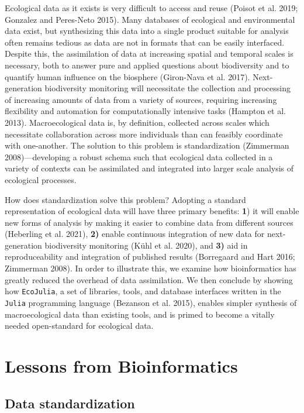 \documentclass[10pt,oneside]{article}
\begin{document}
Ecological data as it exists is very difficult to access and reuse
(Poisot et al. 2019; Gonzalez and Peres-Neto 2015). Many databases of
ecological and environmental data exist, but synthesizing this data into
a single product suitable for analysis often remains tedious as data are
not in formats that can be easily interfaced. Despite this, the
assimilation of data at increasing spatial and temporal scales is
necessary, both to answer pure and applied questions about biodiversity
and to quantify human influence on the biosphere (Giron-Nava et al.
2017). Next-generation biodiversity monitoring will necessitate the
collection and processing of increasing amounts of data from a variety
of sources, requiring increasing flexibility and automation for
computationally intensive tasks (Hampton et al. 2013). Macroecological
data is, by definition, collected across scales which necessitate
collaboration across more individuals than can feasibly coordinate with
one-another. The solution to this problem is standardization (Zimmerman
2008)---developing a robust schema such that ecological data collected
in a variety of contexts can be assimilated and integrated into larger
scale analysis of ecological processes.

How does standardization solve this problem? Adopting a standard
representation of ecological data will have three primary benefits:
\textbf{1}) it will enable new forms of analysis by making it easier to
combine data from different sources (Heberling et al. 2021), \textbf{2)}
enable continuous integration of new data for next-generation
biodiversity monitoring (Kühl et al. 2020), and \textbf{3)} aid in
reproduceability and integration of published results (Borregaard and
Hart 2016; Zimmerman 2008). In order to illustrate this, we examine how
bioinformatics has greatly reduced the overhead of data assimilation. We
then conclude by showing how \texttt{EcoJulia}, a set of libraries,
tools, and database interfaces written in the \texttt{Julia} programming
language (Bezanson et al. 2015), enables simpler synthesis of
macroecological data than existing tools, and is primed to become a
vitally needed open-standard for ecological data.

\hypertarget{lessons-from-bioinformatics}{%
\section{Lessons from
Bioinformatics}\label{lessons-from-bioinformatics}}

\hypertarget{data-standardization}{%
\subsection{Data standardization}\label{data-standardization}}
\end{document}
